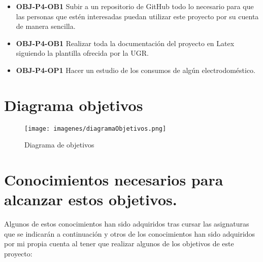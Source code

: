 \begin{itemize}
	\item\textbf{OBJ-P4-OB1} Subir a un repositorio de GitHub todo lo necesario para que las personas que estén interesadas puedan utilizar este proyecto por su cuenta de manera sencilla.
	
	\item\textbf{OBJ-P4-OB1} Realizar toda la documentación del proyecto en Latex siguiendo la plantilla ofrecida por la UGR.
	
	\item\textbf{OBJ-P4-OP1} Hacer un estudio de los consumos de algún electrodoméstico.
	
\end{itemize}

\section{Diagrama objetivos}

\begin{landscape}

	\begin{figure}
		\centering
		\texttt{[image: imagenes/diagramaObjetivos.png]}
		\caption{Diagrama de objetivos}
		\label{fig:Diagrama de objetivos}
	\end{figure}
	
\end{landscape}

\section{Conocimientos necesarios para alcanzar estos objetivos.}

Algunos de estos conocimientos han sido adquiridos tras cursar las asignaturas que se indicarán a continuación y otros de los conocimientos han sido adquiridos por mi propia cuenta al tener que realizar algunos de los objetivos de este proyecto:


